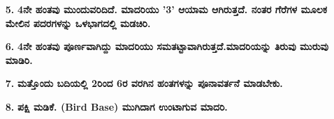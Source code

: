 \begin{enumerate}
\begin{itemize}
\item[{\bf 5.}] \textbf{4ನೇ ಹಂತವು ಮುಂದುವರಿದಿದೆ. ಮಾದರಿಯು '3' ಆಯಾಮ ಆಗಿರುತ್ತದೆ. ನಂತರ ಗೆರೆಗಳ ಮೂಲಕ ಮೇಲಿನ ಪದರಗಳನ್ನು ಒಳಭಾಗದಲ್ಲಿ ಮಡಚಿರಿ.}
\begin{figure}[H]
\end{figure}

\item[{\bf 6.}] \textbf{4ನೇ ಹಂತವು ಪೂರ್ಣವಾಗಿದ್ದು ಮಾದರಿಯು ಸಮತಟ್ಟಾವಾಗಿರುತ್ತದೆ.\break ಮಾದರಿಯನ್ನು ತಿರುವು ಮುರುವು ಮಾಡಿರಿ.}

\item[{\bf 7.}] \textbf{ಮತ್ತೊಂದು ಬದಿಯಲ್ಲಿ 2ರಿಂದ 6ರ ವರಗಿನ ಹಂತಗಳನ್ನು ಪೂನಾವರ್ತನೆ ಮಾಡಬೇಕು.}
\begin{figure}[H]
\end{figure}

\item[{\bf 8.}] \textbf{ಪಕ್ಷಿ ಮಡಿಕೆ. (Bird Base) ಮುಗಿದಾಗ ಉಂಟಾಗುವ ಮಾದರಿ.}
\end{itemize}



\end{enumerate}
